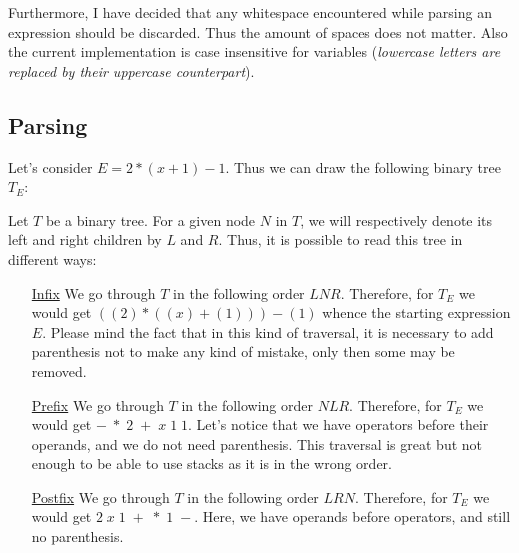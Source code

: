 \documentclass[a4paper,11pt,titlepage]{article}
\begin{document}
Furthermore, I have decided that any whitespace encountered while parsing an expression should be discarded. Thus the amount of spaces does not matter. Also the current implementation is case insensitive for variables (\textit{lowercase letters are replaced by their uppercase counterpart}).

\subsection{Parsing}
Let's consider $E=2*(x+1)-1$. Thus we can draw the following binary tree $T_E$:
\begin{center}
\end{center}

Let $T$ be a binary tree. For a given node $N$ in $T$, we will respectively denote its left and right children by $L$ and $R$. Thus, it is possible to read this tree in different ways:
\begin{enumerate}
    \item[\underline{Infix}] We go through $T$ in the following order $LNR$. Therefore, for $T_E$ we would get $((2)*((x)+(1)))-(1)$ whence the starting expression $E$. Please mind the fact that in this kind of traversal, it is necessary to add parenthesis not to make any kind of mistake, only then some may be removed.
    \item[\underline{Prefix}] We go through $T$ in the following order $NLR$. Therefore, for $T_E$ we would get $-\;*\;2\;+\;x\;1\;1$. Let's notice that we have operators before their operands, and we do not need parenthesis. This traversal is great but not enough to be able to use stacks as it is in the wrong order.
    \item[\underline{Postfix}] We go through $T$ in the following order $LRN$. Therefore, for $T_E$ we would get $2\;x\;1\;+\;*\;1\;-$. Here, we have operands before operators, and still no parenthesis. 
\end{enumerate}
\end{document}
